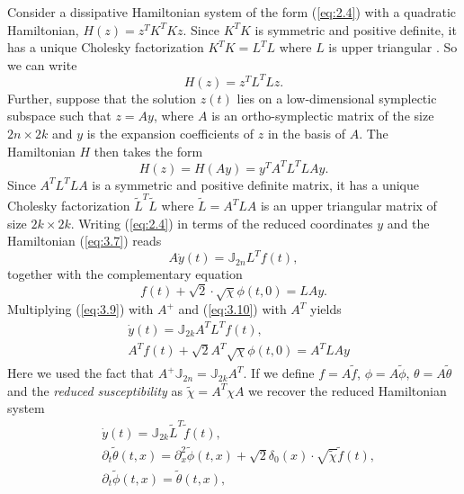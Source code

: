 Consider a dissipative Hamiltonian system of the form (\ref{eq:2.4}) with a quadratic Hamiltonian, $H(z) = z^TK^TKz$. Since $K^TK$ is symmetric and positive definite, it has a unique Cholesky factorization $K^TK = L^T L$ where $L$ is upper triangular \cite{strang09}. So we can write 
\begin{equation} \label{eq:3.7}
H(z) = z^T L^T L z.
\end{equation}
Further, suppose that the solution $z(t)$ lies on a low-dimensional symplectic subspace such that $z = Ay$, where $A$ is an ortho-symplectic matrix of the size $2n\times 2k$ and $y$ is the expansion coefficients of $z$ in the basis of $A$. The Hamiltonian $H$ then takes the form
\begin{equation} \label{eq:3.8}
	H(z) = H(Ay) = y^T A^T L^T L A y.
\end{equation}
Since $A^T L^T L A$ is a symmetric and positive definite matrix, it has a unique Cholesky factorization $\tilde L^T \tilde L$ where $\tilde L = A^T L A$ is an upper triangular matrix of size $2k \times 2k$. Writing (\ref{eq:2.4}) in terms of the reduced coordinates $y$ and the Hamiltonian (\ref{eq:3.7}) reads
\begin{equation} \label{eq:3.9}
		A\dot{y}(t) = \mathbb J_{2n} L^T f(t),
\end{equation}
together with the complementary equation
\begin{equation} \label{eq:3.10}
	f(t) + \sqrt 2 \cdot \sqrt{\chi} \phi(t,0) = LAy.
\end{equation}
Multiplying (\ref{eq:3.9}) with $A^+$ and (\ref{eq:3.10}) with $A^T$ yields
\begin{align} \label{eq:3.11}
	& \dot y(t) = \mathbb J_{2k} A^T L^T f(t), \\
	& A^T f(t) + \sqrt{2} A^T \sqrt{\chi} \phi(t,0) = A^T L A y
\end{align}
Here we used the fact that $A^+\mathbb J_{2n} = \mathbb{J}_{2k} A^T$. If we define $f = A \tilde f$, $\phi = A \tilde \phi$, $\theta = A\tilde \theta$ and the \emph{reduced susceptibility} as $\tilde \chi = A^T \chi A$ we recover the reduced Hamiltonian system
\begin{subequations}
\begin{align}
		\label{eq:3.12.a} & \dot{y}(t) = \mathbb J_{2k} {\tilde L}^T \tilde f(t), \\
		\label{eq:3.12.b} & \partial_t \tilde \theta(t,x) = \partial_x^2 \tilde \phi(t,x) + \sqrt 2 \delta_0(x) \cdot \sqrt{\tilde \chi}  \tilde f(t), \\
		\label{eq:3.12.c} & \partial_t \tilde \phi(t,x) = \tilde \theta(t,x),
\end{align}
\end{subequations}
